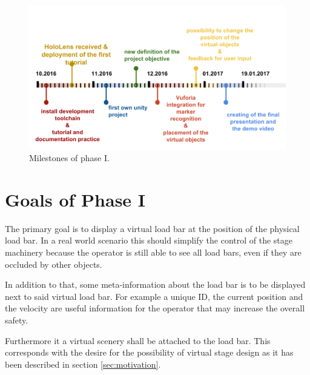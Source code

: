 \begin{figure}[H]
	\centering
	\includegraphics[width=\columnwidth]{images/Milestones.png}
	\caption{Milestones of phase I.}\label{fig:milestones}
\end{figure}

\section{Goals of Phase I}
The primary goal is to display a virtual load bar at the position of the physical load bar. In a real world scenario this should simplify the control of the stage machinery because the operator is still able to see all load bars, even if they are occluded by other objects.

In addition to that, some meta-information about the load bar is to be displayed next to said virtual load bar. For example a unique ID, the current position and the velocity are useful information for the operator that may increase the overall safety.

Furthermore it a virtual scenery shall be attached to the load bar. This corresponds with the desire for the possibility of virtual stage design as it has been described in section \ref{sec:motivation}.

